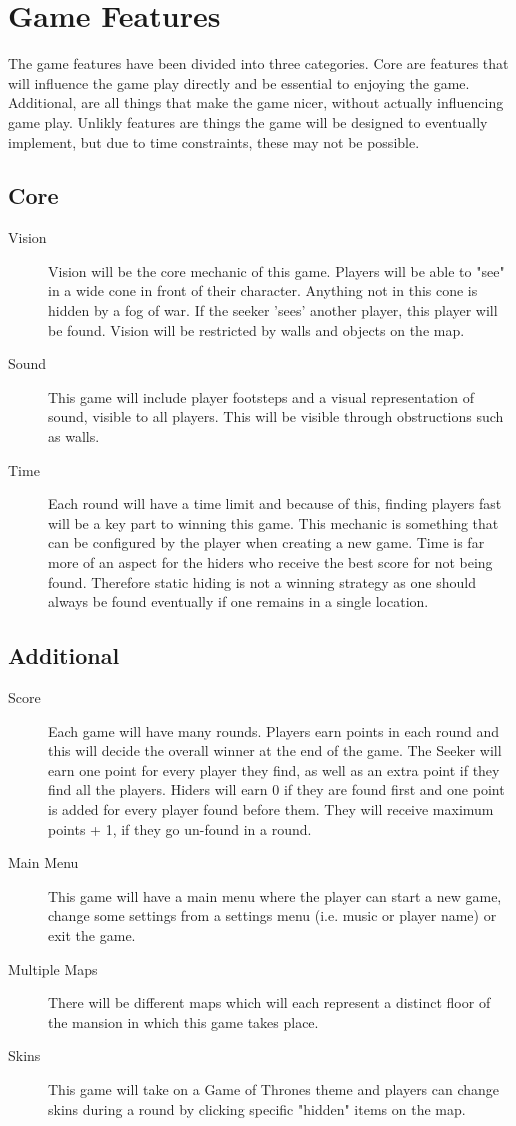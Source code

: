 \documentclass[]{report}
\begin{document}
\section{Game Features}
The game features have been divided into three categories. Core are features that will influence the game play directly and be essential to enjoying the game. Additional, are all things that make the game nicer, without actually influencing game play. Unlikly features are things the game will be designed to eventually implement, but due to time constraints, these may not be possible.
\subsection{Core}
\begin{description}
	\item[Vision] Vision will be the core mechanic of this game. Players will be able to "see" in a wide cone in front of their character. Anything not in this cone is hidden by a fog of war. If the seeker 'sees' another player, this player will be found. Vision will be restricted by walls and objects on the map.
	\item[Sound] This game will include player footsteps and a visual representation of sound, visible to all players. This will be visible through obstructions such as walls.
	\item[Time] Each round will have a time limit and because of this, finding players fast will be a key part to winning this game. This mechanic is something that can be configured by the player when creating a new game. Time is far more of an aspect for the hiders who receive the best score for not being found. Therefore static hiding is not a winning strategy as one should always be found eventually if one remains in a single location.
\end{description}
\subsection{Additional}
\begin{description}
	\item[Score] Each game will have many rounds. Players earn points in each round and this will decide the overall winner at the end of the game. The Seeker will earn one point for every player they find, as well as an extra point if they find all the players. Hiders will earn 0 if they are found first and one point is added for every player found before them. They will receive maximum points + 1, if they go un-found in a round.
	\item[Main Menu] This game will have a main menu where the player can start a new game, change some settings from a settings menu (i.e. music or player name) or exit the game. 
	\item[Multiple Maps] There will be different maps which will each represent a distinct floor of the mansion in which this game takes place.	
	\item[Skins] This game will take on a Game of Thrones theme and players can change skins during a round by clicking specific "hidden" items on the map. 
\end{description}
\end{document}
